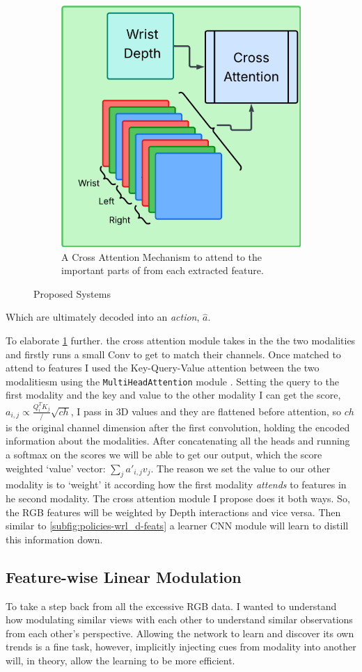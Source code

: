 \begin{figure}[htpb]
\begin{subfigure}{0.45\linewidth}
    \centering
    \includegraphics[width=0.3\linewidth]{assets/cam-comb/policies/wlr_d-attn-diagram.png}
    \caption{A Cross Attention Mechanism to attend to the important parts of from each extracted feature.}\label{subfig:policies-wrl_d-attn}
  \end{subfigure}
  \caption{Proposed Systems}\label{fig:policies-sep-dep-diagrams}
\end{figure}
Which are ultimately decoded into an \emph{action}, $\hat{a}$.

To elaborate \ref{subfig:policies-wrl_d-attn} further. the cross attention module takes in the the two modalities and firstly runs a small Conv to get to match their channels. Once matched to attend to features I used the Key-Query-Value attention \cite{vaswani2023attentionneed} between the two modalitiesm using the \verb|MultiHeadAttention| module \cite{pytorch}. Setting the query to the first modality and the key and value to the other modality I can get the score, \( a_{i, j} \propto \frac{Q_i^TK_j}/\sqrt{ch}\), I pass in 3D values and they are flattened before attention, so $ch$ is the original channel dimension after the first convolution, holding the encoded information about the modalities. After concatenating all the heads and running a softmax on the scores we will be able to get our output, which the score weighted `value' vector: \(\sum_{j}{{a'}_{i, j}v_j}\). The reason we set the value to our other modality is to `weight' it according how the first modality \emph{attends} to features in he second modality. The cross attention module I propose does it both ways. So, the RGB features will be weighted by Depth interactions and vice versa. Then similar to \ref{subfig:policies-wrl_d-feats} a learner CNN module will learn to distill this information down.


\subsection{Feature-wise Linear Modulation}\label{subsec:policies-film}
To take a step back from all the excessive RGB data. I wanted to understand how modulating similar views with each other to understand similar observations from each other's perspective. Allowing the network to learn and discover its own trends is a fine task, however, implicitly injecting cues from modality into another will, in theory, allow the learning to be more efficient.


